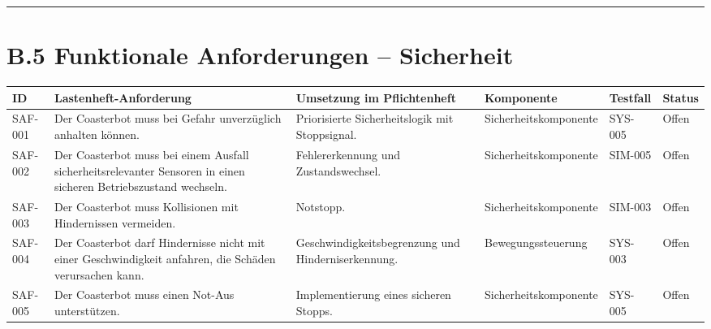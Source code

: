 \documentclass[
]{article}
\begin{document}
\begin{center}\rule{0.5\linewidth}{0.5pt}\end{center}

\section{B.5 Funktionale Anforderungen --
Sicherheit}\label{b.5-funktionale-anforderungen-sicherheit}

\begin{longtable}[]{@{}
  >{\raggedright\arraybackslash}p{}
  >{\raggedright\arraybackslash}p{}
  >{\raggedright\arraybackslash}p{}
  >{\raggedright\arraybackslash}p{}
  >{\raggedright\arraybackslash}p{}
  >{\raggedright\arraybackslash}p{}@{}}
\toprule\noalign{}
\begin{minipage}[b]{\linewidth}\raggedright
ID
\end{minipage} & \begin{minipage}[b]{\linewidth}\raggedright
Lastenheft-Anforderung
\end{minipage} & \begin{minipage}[b]{\linewidth}\raggedright
Umsetzung im Pflichtenheft
\end{minipage} & \begin{minipage}[b]{\linewidth}\raggedright
Komponente
\end{minipage} & \begin{minipage}[b]{\linewidth}\raggedright
Testfall
\end{minipage} & \begin{minipage}[b]{\linewidth}\raggedright
Status
\end{minipage} \\
\midrule\noalign{}
\endhead
\bottomrule\noalign{}
\endlastfoot
SAF-001 & Der Coasterbot muss bei Gefahr unverzüglich anhalten können. &
Priorisierte Sicherheitslogik mit Stoppsignal. & Sicherheitskomponente &
SYS-005 & Offen \\
SAF-002 & Der Coasterbot muss bei einem Ausfall sicherheitsrelevanter
Sensoren in einen sicheren Betriebszustand wechseln. & Fehlererkennung
und Zustandswechsel. & Sicherheitskomponente & SIM-005 & Offen \\
SAF-003 & Der Coasterbot muss Kollisionen mit Hindernissen vermeiden. &
Notstopp. & Sicherheitskomponente & SIM-003 & Offen \\
SAF-004 & Der Coasterbot darf Hindernisse nicht mit einer
Geschwindigkeit anfahren, die Schäden verursachen kann. &
Geschwindigkeitsbegrenzung und Hinderniserkennung. & Bewegungssteuerung
& SYS-003 & Offen \\
SAF-005 & Der Coasterbot muss einen Not-Aus unterstützen. &
Implementierung eines sicheren Stopps. & Sicherheitskomponente & SYS-005
& Offen \\
\end{longtable}
\end{document}
